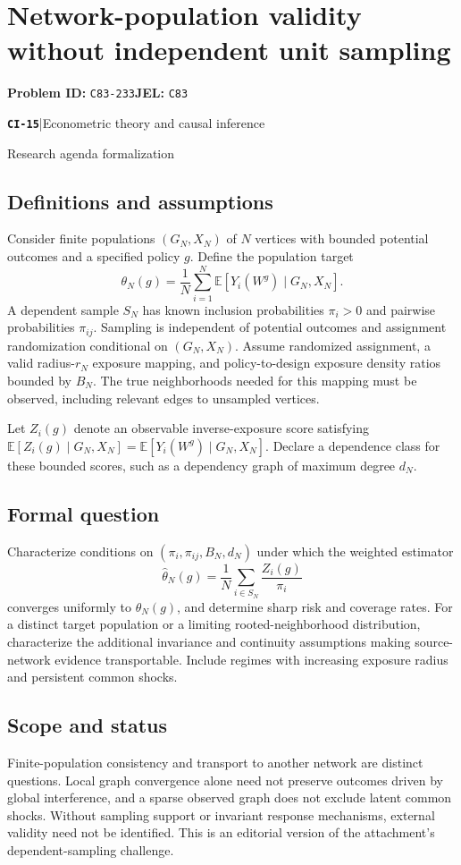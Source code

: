 \documentclass[11pt,a4paper]{article}
\newcommand{\E}{\mathbb E}
\newcommand{\entrymeta}[3]{{\sffamily\small\color{muted}\textbf{\texttt{#1}}\quad|\quad #2\par #3\par}}
\begin{document}
\section*{Network-population validity without independent unit sampling}
\textbf{Problem ID:} \texttt{C83-233}\quad \textbf{JEL:} \texttt{C83}\par
\label{problem:OP-0494}
\label{beyond:CI-15}
\entrymeta{CI-15}{Econometric theory and causal inference}{Research agenda formalization}
\subsection*{Definitions and assumptions}
Consider finite populations $(G_N,X_N)$ of $N$ vertices with bounded potential outcomes and a specified policy $g$. Define the population target
\[
\theta_N(g)=\frac1N\sum_{i=1}^N
 \E[Y_i(W^g)\mid G_N,X_N].
\]
A dependent sample $S_N$ has known inclusion probabilities $\pi_i>0$ and pairwise probabilities $\pi_{ij}$. Sampling is independent of potential outcomes and assignment randomization conditional on $(G_N,X_N)$. Assume randomized assignment, a valid radius-$r_N$ exposure mapping, and policy-to-design exposure density ratios bounded by $B_N$. The true neighborhoods needed for this mapping must be observed, including relevant edges to unsampled vertices.

Let $Z_i(g)$ denote an observable inverse-exposure score satisfying
$\E[Z_i(g)\mid G_N,X_N]=\E[Y_i(W^g)\mid G_N,X_N]$.
Declare a dependence class for these bounded scores, such as a dependency graph of maximum degree $d_N$.
\subsection*{Formal question}
Characterize conditions on $(\pi_i,\pi_{ij},B_N,d_N)$ under which the weighted estimator
\[
 \widehat\theta_N(g)=\frac1N\sum_{i\in S_N}\frac{Z_i(g)}{\pi_i}
\]
converges uniformly to $\theta_N(g)$, and determine sharp risk and coverage rates. For a distinct target population or a limiting rooted-neighborhood distribution, characterize the additional invariance and continuity assumptions making source-network evidence transportable. Include regimes with increasing exposure radius and persistent common shocks.
\subsection*{Scope and status}
Finite-population consistency and transport to another network are distinct questions. Local graph convergence alone need not preserve outcomes driven by global interference, and a sparse observed graph does not exclude latent common shocks. Without sampling support or invariant response mechanisms, external validity need not be identified. This is an editorial version of the attachment's dependent-sampling challenge.
\end{document}
